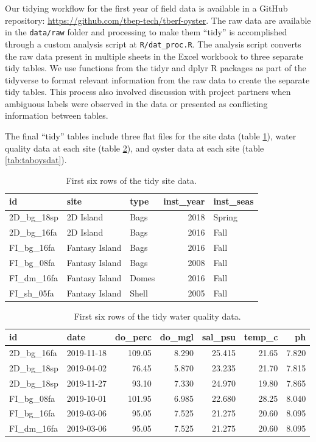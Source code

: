 \documentclass[
]{book}
\begin{document}
Our tidying workflow for the first year of field data is available in a GitHub repository: \url{https://github.com/tbep-tech/tberf-oyster}. The raw data are available in the \texttt{data/raw} folder and processing to make them ``tidy'' is accomplished through a custom analysis script at \texttt{R/dat\_proc.R}. The analysis script converts the raw data present in multiple sheets in the Excel workbook to three separate tidy tables. We use functions from the tidyr and dplyr R packages as part of the tidyverse \citep{Wickham19} to format relevant information from the raw data to create the separate tidy tables. This process also involved discussion with project partners when ambiguous labels were observed in the data or presented as conflicting information between tables.

The final ``tidy'' tables include three flat files for the site data (table \ref{tab:tabsitdat}), water quality data at each site (table \ref{tab:tabwqmdat}), and oyster data at each site (table \ref{tab:taboysdat}).

\begin{table}

\caption{\label{tab:tabsitdat}First six rows of the tidy site data.}
\centering
\begin{tabular}[t]{l|l|l|r|l}
\hline
id & site & type & inst\_year & inst\_seas\\
\hline
2D\_bg\_18sp & 2D Island & Bags & 2018 & Spring\\
\hline
2D\_bg\_16fa & 2D Island & Bags & 2016 & Fall\\
\hline
FI\_bg\_16fa & Fantasy Island & Bags & 2016 & Fall\\
\hline
FI\_bg\_08fa & Fantasy Island & Bags & 2008 & Fall\\
\hline
FI\_dm\_16fa & Fantasy Island & Domes & 2016 & Fall\\
\hline
FI\_sh\_05fa & Fantasy Island & Shell & 2005 & Fall\\
\hline
\end{tabular}
\end{table}

\begin{table}

\caption{\label{tab:tabwqmdat}First six rows of the tidy water quality data.}
\centering
\begin{tabular}[t]{l|l|r|r|r|r|r}
\hline
id & date & do\_perc & do\_mgl & sal\_psu & temp\_c & ph\\
\hline
2D\_bg\_16fa & 2019-11-18 & 109.05 & 8.290 & 25.415 & 21.65 & 7.820\\
\hline
2D\_bg\_18sp & 2019-04-02 & 76.45 & 5.870 & 23.235 & 21.70 & 7.815\\
\hline
2D\_bg\_18sp & 2019-11-27 & 93.10 & 7.330 & 24.970 & 19.80 & 7.865\\
\hline
FI\_bg\_08fa & 2019-10-01 & 101.95 & 6.985 & 22.680 & 28.25 & 8.040\\
\hline
FI\_bg\_16fa & 2019-03-06 & 95.05 & 7.525 & 21.275 & 20.60 & 8.095\\
\hline
FI\_dm\_16fa & 2019-03-06 & 95.05 & 7.525 & 21.275 & 20.60 & 8.095\\
\hline
\end{tabular}
\end{table}
\end{document}
